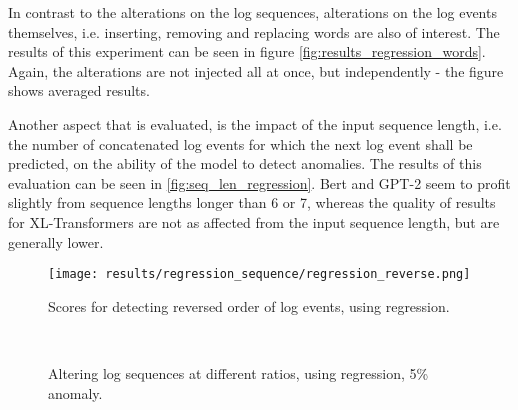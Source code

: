 In contrast to the alterations on the log sequences, alterations on the log events themselves, i.e. inserting, removing and replacing words are also of interest. The results of this experiment can be seen in figure \ref{fig:results_regression_words}. Again, the alterations are not injected all at once, but independently - the figure shows averaged results.

Another aspect that is evaluated, is the impact of the input sequence length, i.e. the number of concatenated log events for which the next log event shall be predicted, on the ability of the model to detect anomalies. The results of this evaluation can be seen in \ref{fig:seq_len_regression}. Bert and GPT-2 seem to profit slightly from sequence lengths longer than 6 or 7, whereas the quality of results for XL-Transformers are not as affected from the input sequence length, but are generally lower.

\begin{figure}[h]
  \centering
  \texttt{[image: results/regression\_sequence/regression\_reverse.png]}\\
  \caption{Scores for detecting reversed order of log events, using regression.}
  \label{fig:regression_reverse_order}
\end{figure}

\begin{figure*}[ht!]
\hspace{\fill}
\hspace{\fill}
   \\
\caption{\label{fig:results_regression_sequential}Altering log sequences at different ratios, using regression, 5\% anomaly.}
\end{figure*}


